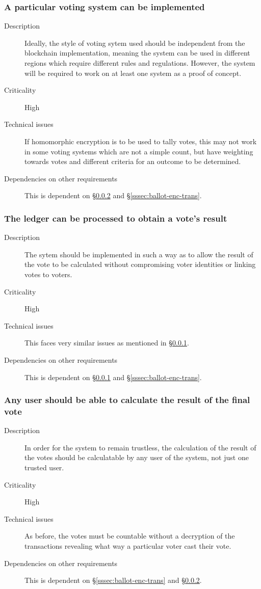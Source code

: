 \documentclass[a4paper,12pt]{article}
\begin{document}
\subsubsection{A particular voting system can be implemented}
\label{sssec:vote-sys-rep}
\begin{description}
	\item[Description]
		Ideally, the style of voting sytem used should be independent from the blockchain implementation, meaning the system can be used in different regions which require different rules and regulations. However, the system will be required to work on at least one system as a proof of concept.
	\item[Criticality]
		High
	\item[Technical issues]
		If homomorphic encryption is to be used to tally votes, this may not work in some voting systems which are not a simple count, but have weighting towards votes and different criteria for an outcome to be determined.
	\item[Dependencies on other requirements]
		This is dependent on \S\ref{sssec:vote-sys-calc} and \S\ref{sssec:ballot-enc-trans}.
\end{description}

\subsubsection{The ledger can be processed to obtain a vote's result}
\label{sssec:vote-sys-calc}
\begin{description}
	\item[Description]
		The sytem should be implemented in such a way as to allow the result of the vote to be calculated without compromising voter identities or linking votes to voters.
	\item[Criticality]
		High
	\item[Technical issues]
		This faces very similar issues as mentioned in \S\ref{sssec:vote-sys-rep}.
	\item[Dependencies on other requirements]
		This is dependent on \S\ref{sssec:vote-sys-rep} and \S\ref{sssec:ballot-enc-trans}.
\end{description}

\subsubsection{Any user should be able to calculate the result of the final vote}
\begin{description}
	\item[Description]
		In order for the system to remain trustless, the calculation of the result of the votes should be calculatable by any user of the system, not just one trusted user.
	\item[Criticality]
		High
	\item[Technical issues]
		As before, the votes must be countable without a decryption of the transactions revealing what way a particular voter cast their vote.
	\item[Dependencies on other requirements]
		This is dependent on \S\ref{sssec:ballot-enc-trans} and \S\ref{sssec:vote-sys-calc}.
\end{description}
\end{document}
